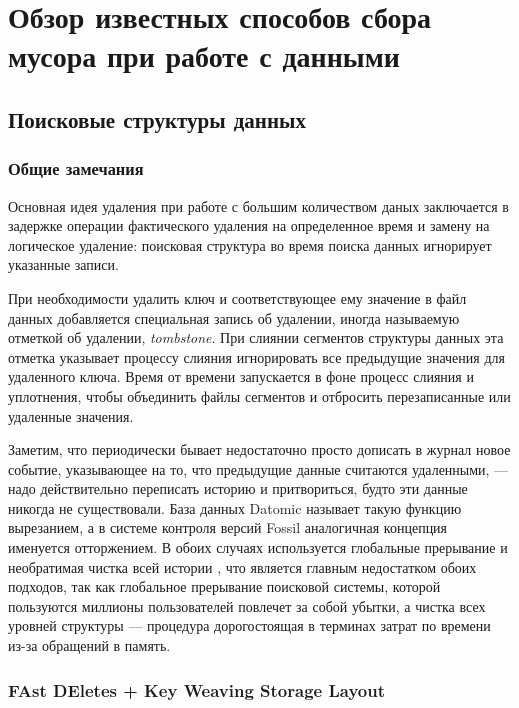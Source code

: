 \newpage
\section{Обзор известных способов сбора мусора при работе с данными}

\subsection{Поисковые структуры данных}

\subsubsection{Общие замечания}

Основная идея удаления при работе с большим количеством даных заключается в задержке
операции фактического удаления на определенное время и замену на логическое удаление:
поисковая структура во время поиска данных игнорирует указанные записи. 

При необходимости удалить ключ и соответствующее ему значение в файл данных добавляется
специальная запись об удалении, иногда называемую отметкой об удалении,
\textit{tombstone}. При слиянии сегментов структуры данных эта отметка
указывает процессу слияния игнорировать все предыдущие значения для удаленного ключа.
Время от времени запускается в фоне процесс слияния и уплотнения, чтобы объединить файлы
сегментов и отбросить перезаписанные или удаленные значения.

Заметим, что периодически бывает недостаточно просто дописать в журнал новое событие,
указывающее на то, что предыдущие данные считаются удаленными, — надо действительно
переписать историю и притвориться, будто эти данные никогда не существовали. 
База данных Datomic \cite{Datomic:2021} называет такую функцию вырезанием,
а в системе контроля версий Fossil \cite{Fossil:2017} аналогичная концепция
именуется отторжением. В обоих случаях используется глобальные прерывание
и необратимая чистка всей истории \cite{Kleppman:2017}, что является главным недостатком
обоих подходов, так как глобальное прерывание поисковой системы, которой пользуются миллионы
пользователей повлечет за собой убытки, а чистка всех уровней структуры — процедура
дорогостоящая в терминах затрат по времени из-за обращений в память.  

\subsubsection{FAst DEletes + Key Weaving Storage Layout}

